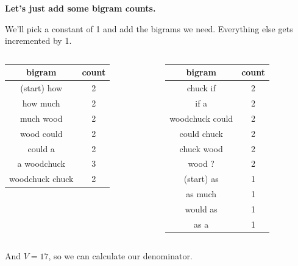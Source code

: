 \documentclass{beamer}
\newcommand{\pagestepalt}[2]{
  \begin{frame}[t]
    \begin{minipage}[t][0.26\textheight][t]{\textwidth}
      \begin{center}
        \huge
        \textbf{#1}
      \end{center}
    \end{minipage}
    
    \begin{minipage}[t][0.7\textheight][t]{\textwidth}
      #2
    \end{minipage}
  \end{frame}
}
\begin{document}
\pagestepalt{Let's just add some bigram counts.}{
  We'll pick a constant of 1 and add the bigrams we need. Everything
  else gets incremented by 1.
  \vspace{-0.75cm}
  \begin{columns}[T]
      \begin{column}{0.5\textwidth}
        \begin{center}
          \small
          \begin{tabular}{c|c}
            bigram & count \\
            \hline
            (start) how & \alert{2} \\
            how much & \alert{2} \\
            much wood & \alert{2} \\
            wood could & \alert{2} \\
            could a & \alert{2} \\
            a woodchuck & \alert{3} \\
            woodchuck chuck & \alert{2} \\
          \end{tabular}
        \end{center}
      \end{column}
      \begin{column}{0.5\textwidth}
        \begin{center}
          \small
          \begin{tabular}{c|c}
            bigram & count \\
            \hline
            chuck if & \alert{2}\\
            if a & \alert{2} \\
            woodchuck could & \alert{2} \\
            could chuck & \alert{2} \\
            chuck wood & \alert{2} \\
            wood ? & \alert{2} \\
            \alert{(start) as} & 1\\
            \alert{as much} & 1 \\
            \alert{would as} & 1 \\
            \alert{as a} & 1 \\
          \end{tabular}
        \end{center}
      \end{column}
  \end{columns} 

  \vspace{0.1cm}
  And $V = 17$, so we can calculate our denominator.
}
\end{document}
